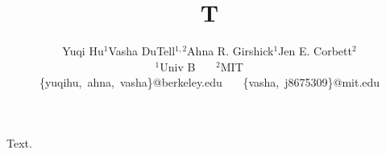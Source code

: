 \documentclass{article}
\title{T}
\author{Yuqi Hu$^1$\qquad Vasha DuTell$^{1,2}$\qquad Ahna R. Girshick$^1$\qquad Jen E. Corbett$^2$\qquad \\[0.5em]
$^1$Univ B \ \ \ $^2$MIT \ \ \ \\
\normalsize \{yuqihu,~ahna,~vasha\}@berkeley.edu \ \ \ \{vasha,~j8675309\}@mit.edu}
\begin{document}
\maketitle
Text.
\end{document}
